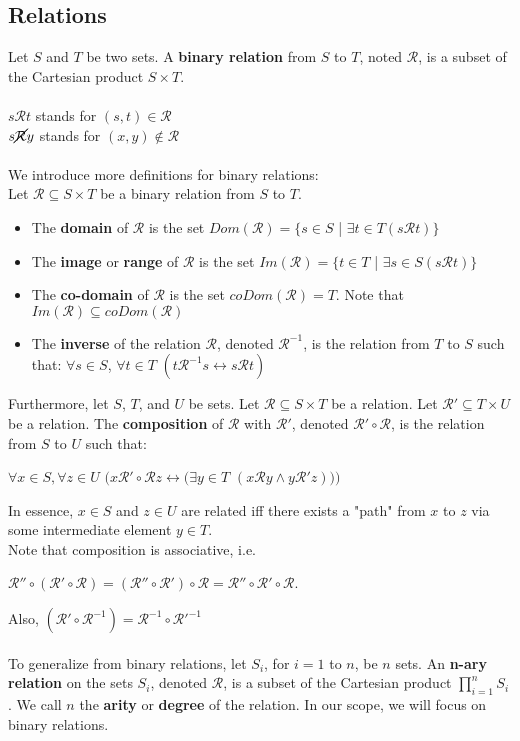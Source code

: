 \documentclass[a4paper]{article}
\begin{document}
\subsection{Relations}
Let $S$ and $T$ be two sets. A \textbf{binary relation} from $S$ to $T$, noted $\mathcal{R}$, is a subset of the Cartesian product $S\times T$.\\ \\
$s \mathcal{R} t$ stands for $(s,t) \in \mathcal{R}$\\
$s \cancel{\mathcal{R}} y$ stands for $(x,y) \notin \mathcal{R}$\\ \\
We introduce more definitions for binary relations:\\
Let $\mathcal{R} \subseteq S \times T$ be a binary relation from $S$ to $T$.
\begin{itemize}
	\item The \textbf{domain} of $\mathcal{R}$ is the set $Dom(\mathcal{R}) = \{s \in S$ | $\exists t \in T (s \mathcal{R} t)\}$
	\item The \textbf{image} or \textbf{range} of $\mathcal{R}$ is the set $Im(\mathcal{R}) = \{t \in T$ | $\exists s \in S (s \mathcal{R} t)\}$
	\item The \textbf{co-domain} of $\mathcal{R}$ is the set $coDom(\mathcal{R}) = T$. Note that $Im(\mathcal{R}) \subseteq coDom(\mathcal{R})$
	\item The \textbf{inverse} of the relation $\mathcal{R}$, denoted $\mathcal{R}^{-1}$, is the relation from $T$ to $S$ such that: $\forall s \in S$, $\forall t \in T$ $(t \mathcal{R}^{-1} s \leftrightarrow s \mathcal{R} t)$
\end{itemize}
Furthermore, let $S$, $T$, and $U$ be sets. Let $\mathcal{R} \subseteq S \times T$ be a relation. Let $\mathcal{R}' \subseteq T \times U$ be a relation. The \textbf{composition} of $\mathcal{R}$ with $\mathcal{R}'$, denoted $\mathcal{R}' \circ \mathcal{R}$, is the relation from $S$ to $U$ such that:
\begin{center}
	$\forall x \in S, \forall z \in U$ $(x\mathcal{R}'\circ \mathcal{R} z \leftrightarrow (\exists y \in T$ $(x \mathcal{R} y \land y \mathcal{R}' z)))$
\end{center}
In essence, $x \in S$ and $z \in U$ are related iff there exists a "path" from $x$ to $z$ via some intermediate element $y \in T$.\\ Note that composition is associative, i.e.
\begin{center}
	$\mathcal{R}'' \circ (\mathcal{R}' \circ \mathcal{R}) = (\mathcal{R}'' \circ \mathcal{R}') \circ \mathcal{R} = \mathcal{R}'' \circ \mathcal{R}' \circ \mathcal{R}$.
\end{center}
Also, $(\mathcal{R}' \circ \mathcal{R}^{-1}) = \mathcal{R}^{-1} \circ \mathcal{R}'^{-1}$\\ \\
To generalize from binary relations, let $S_i$, for $i=1$ to $n$, be $n$ sets. An \textbf{n-ary relation} on the sets $S_i$, denoted $\mathcal{R}$, is a subset of the Cartesian product $\prod_{i=1}^{n} S_i$. We call $n$ the \textbf{arity} or \textbf{degree} of the relation. In our scope, we will focus on binary relations.
\end{document}
